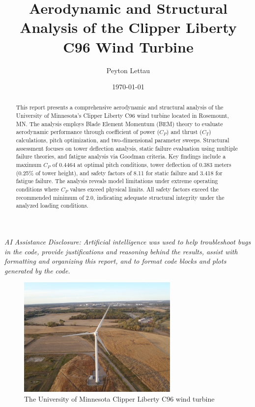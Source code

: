 \documentclass[11pt]{article}
\title{Aerodynamic and Structural Analysis of the Clipper Liberty C96 Wind Turbine}
\author{Peyton Lettau}
\date{\today}
\begin{document}
\maketitle

\begin{center}
\begin{minipage}{0.9\textwidth}
\small\textit{AI Assistance Disclosure: Artificial intelligence was used to help troubleshoot bugs in the code, provide justifications and reasoning behind the results, assist with formatting and organizing this report, and to format code blocks and plots generated by the code.}
\end{minipage}
\end{center}

\begin{abstract}
This report presents a comprehensive aerodynamic and structural analysis of the University of Minnesota's Clipper Liberty C96 wind turbine located in Rosemount, MN. The analysis employs Blade Element Momentum (BEM) theory to evaluate aerodynamic performance through coefficient of power ($C_P$) and thrust ($C_T$) calculations, pitch optimization, and two-dimensional parameter sweeps. Structural assessment focuses on tower deflection analysis, static failure evaluation using multiple failure theories, and fatigue analysis via Goodman criteria. Key findings include a maximum $C_P$ of 0.4464 at optimal pitch conditions, tower deflection of 0.383 meters (0.25\% of tower height), and safety factors of 8.11 for static failure and 3.418 for fatigue failure. The analysis reveals model limitations under extreme operating conditions where $C_P$ values exceed physical limits. All safety factors exceed the recommended minimum of 2.0, indicating adequate structural integrity under the analyzed loading conditions.
\end{abstract}

\begin{figure}[H]
  \centering
  \includegraphics[width=0.7\textwidth]{../../PNGS/UMN turbine.jpg}
  \caption{The University of Minnesota Clipper Liberty C96 wind turbine}
  \label{fig:umn_turbine_photo}
\end{figure}
\end{document}

